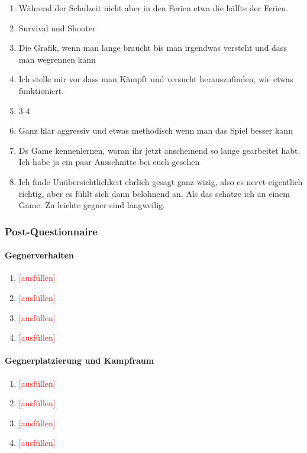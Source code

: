 \documentclass[../Main.tex]{subfiles}
\begin{document}
\begin{enumerate}[label=\textbf{P\arabic*}, leftmargin=1.5cm, itemsep=0.5em]
    \item Während der Schulzeit nicht aber in den Ferien etwa die hälfte der Ferien.
    \item Survival und Shooter
    \item Die Grafik, wenn man lange braucht bis man irgendwas versteht und dass man wegrennen kann
    \item Ich stelle mir vor dass man Kämpft und versucht herauszufinden, wie etwas funktioniert.
    \item 3-4
    \item Ganz klar aggressiv und etwas methodisch wenn man das Spiel besser kann
    \item Ds Game kennenlernen, woran ihr jetzt anscheinend so lange gearbeitet habt. Ich habe ja ein paar Ausschnitte bei euch gesehen
    \item Ich finde Unübersichtlichkeit ehrlich gesagt ganz wizig, also es nervt eigentlich richtig, aber es fühlt sich dann belohnend an. Als das schätze ich an einem Game. Zu leichte gegner sind langweilig.
\end{enumerate}

\subsubsection{Post-Questionnaire}

\paragraph{Gegnerverhalten}
\begin{enumerate}[label=\textbf{Q\arabic*}, leftmargin=1.5cm, itemsep=0.5em]
    \item \textcolor{red}{[ausfüllen]}
    \item \textcolor{red}{[ausfüllen]}
    \item \textcolor{red}{[ausfüllen]}
    \item \textcolor{red}{[ausfüllen]}
\end{enumerate}

\paragraph{Gegnerplatzierung und Kampfraum}
\begin{enumerate}[label=\textbf{Q\arabic*}, leftmargin=1.5cm, itemsep=0.5em, resume]
    \item \textcolor{red}{[ausfüllen]}
    \item \textcolor{red}{[ausfüllen]}
    \item \textcolor{red}{[ausfüllen]}
    \item \textcolor{red}{[ausfüllen]}
\end{enumerate}
\end{document}
